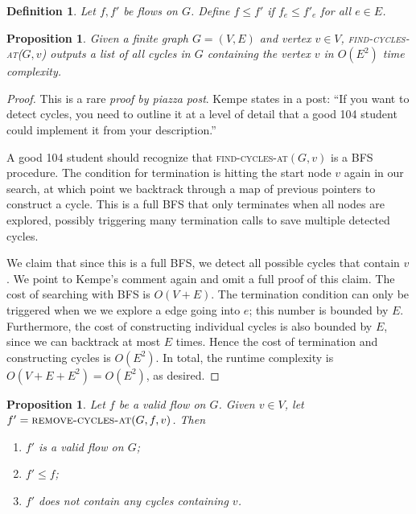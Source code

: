 \documentclass[10pt]{article}
\newtheorem{proposition}[lemma]{Proposition}
\newtheorem{definition}{Definition}
\begin{document}
\begin{definition}
  Let \(f, f'\) be flows on \(G\). Define \(f \leq f'\) if \(f_e \leq f'_e\) for all \(e \in E\). 
\end{definition}

\begin{proposition}
  Given a finite graph \(G = (V, E)\) and vertex \(v \in V\), \textsc{find-cycles-at}(\(G, v\)) outputs a list of all cycles in \(G\) containing the vertex \(v\) in \(O(E^2)\) time complexity.
\end{proposition}

\begin{proof}
  This is a rare \textit{proof by piazza post}. Kempe states in a post: ``If you want to detect cycles, you need to outline it at a level of detail that a good 104 student could implement it from your description.''

  A good 104 student should recognize that \textsc{find-cycles-at}\((G, v)\) is a BFS procedure. The condition for termination is hitting the start node \(v\) again in our search, at which point we backtrack through a map of previous pointers to construct a cycle. This is a full BFS that only terminates when all nodes are explored, possibly triggering many termination calls to save multiple detected cycles. 

  We claim that since this is a full BFS, we detect all possible cycles that contain \(v\). We point to Kempe's comment again and omit a full proof of this claim. The cost of searching with BFS is \(O(V + E)\). The termination condition can only be triggered when we we explore a edge going into \(e\); this number is bounded by \(E\). Furthermore, the cost of constructing individual cycles is also bounded by \(E\), since we can backtrack at most \(E\) times. Hence the cost of termination and constructing cycles is \(O(E^2)\). In total, the runtime complexity is \(O(V + E + E^2) = O(E^2)\), as desired.
\end{proof}

\begin{proposition}
  Let \(f\) be a valid flow on \(G\). Given \(v \in V\), let \(f' = \textsc{remove-cycles-at}(G, f, v)\).
  Then 
  \begin{enumerate}
    \item \(f'\) is a valid flow on \(G\);
    \item \(f' \le f\);
    \item \(f'\) does not contain any cycles containing \(v\).
  \end{enumerate}
\end{proposition}
\end{document}
